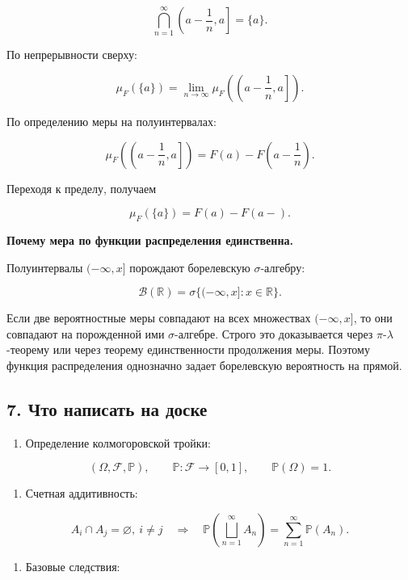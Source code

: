 \documentclass[
  11pt,
  a4paper,
]{article}
\providecommand{\tightlist}{%
  \setlength{\itemsep}{0pt}\setlength{\parskip}{0pt}}
\begin{document}
\[
\bigcap_{n=1}^{\infty}\left(a-\frac1n,a\right]=\{a\}.
\]

По непрерывности сверху:

\[
\mu_F(\{a\})
=
\lim_{n\to\infty}\mu_F\left(\left(a-\frac1n,a\right]\right).
\]

По определению меры на полуинтервалах:

\[
\mu_F\left(\left(a-\frac1n,a\right]\right)
=
F(a)-F\left(a-\frac1n\right).
\]

Переходя к пределу, получаем

\[
\mu_F(\{a\})=F(a)-F(a-).
\]

\textbf{Почему мера по функции распределения единственна.}

Полуинтервалы \((-\infty,x]\) порождают борелевскую \(\sigma\)-алгебру:

\[
\mathcal B(\mathbb R)=\sigma\{(-\infty,x]:x\in\mathbb R\}.
\]

Если две вероятностные меры совпадают на всех множествах
\((-\infty,x]\), то они совпадают на порожденной ими \(\sigma\)-алгебре.
Строго это доказывается через \(\pi\)-\(\lambda\)-теорему или через
теорему единственности продолжения меры. Поэтому функция распределения
однозначно задает борелевскую вероятность на прямой.

\subsection{7. Что написать на
доске}\label{ux447ux442ux43e-ux43dux430ux43fux438ux441ux430ux442ux44c-ux43dux430-ux434ux43eux441ux43aux435}

\begin{enumerate}
\def\labelenumi{\arabic{enumi}.}
\tightlist
\item
  Определение колмогоровской тройки:
\end{enumerate}

\[
(\Omega,\mathcal F,\mathbb P),\qquad
\mathbb P:\mathcal F\to[0,1],\qquad
\mathbb P(\Omega)=1.
\]

\begin{enumerate}
\def\labelenumi{\arabic{enumi}.}
\setcounter{enumi}{1}
\tightlist
\item
  Счетная аддитивность:
\end{enumerate}

\[
A_i\cap A_j=\varnothing,\ i\ne j
\quad\Rightarrow\quad
\mathbb P\left(\bigsqcup_{n=1}^{\infty}A_n\right)
=
\sum_{n=1}^{\infty}\mathbb P(A_n).
\]

\begin{enumerate}
\def\labelenumi{\arabic{enumi}.}
\setcounter{enumi}{2}
\tightlist
\item
  Базовые следствия:
\end{enumerate}
\end{document}
